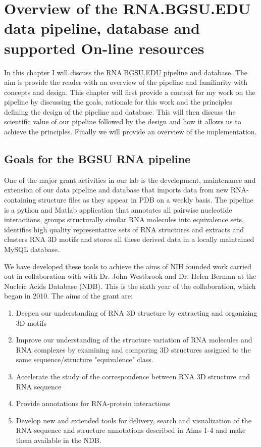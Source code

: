 \chapter{Overview of the RNA.BGSU.EDU data pipeline, database and supported
On-line resources}

In this chapter I will discuss the \href{http://rna.bgsu.edu}{RNA.BGSU.EDU}
pipeline and database. The aim is provide the reader with an overview of the
pipeline and familiarity with concepts and design. This chapter will first
provide a context for my work on the pipeline by discussing the goals, rationale
for this work and the principles defining the design of the pipeline and
database. This will then discuss the scientific value of our pipeline followed
by the design and how it allows us to achieve the principles. Finally we will
provide an overview of the implementation. 

\section{Goals for the BGSU RNA pipeline}

One of the major grant activities in our lab is the development, maintenance and
extension of our data pipeline and database that imports data from new
RNA-containing structure files as they appear in PDB on a weekly basis. The
pipeline is a python and Matlab application that annotates all pairwise
nucleotide interactions, groups structurally similar RNA molecules into
equivalence sets, identifies high quality representative sets of RNA structures
and extracts and clusters RNA 3D motifs and stores all these derived data in a
locally maintained MySQL database.

We have developed these tools to achieve the aims of NIH founded work carried
out in collaboration with with Dr. John Westbrook and Dr. Helen Berman at the
Nucleic Acids Database (NDB). This is the sixth year of the collaboration, which
began in 2010. The aims of the grant are:

\begin{enumerate}
        \item Deepen our understanding of RNA 3D structure by extracting and
                organizing 3D motifs

        \item Improve our understanding of the structure variation of RNA
                molecules and RNA complexes by examining and comparing 3D
                structures assigned to the same sequence/structure "equivalence"
                class.

        \item Accelerate the study of the correspondence between RNA 3D
                structure and RNA sequence

        \item Provide annotations for RNA-protein interactions

        \item Develop new and extended tools for delivery, search and
                visualization of the RNA sequence and structure annotations
                described in Aims 1-4 and make them available in the NDB.
\end{enumerate}

